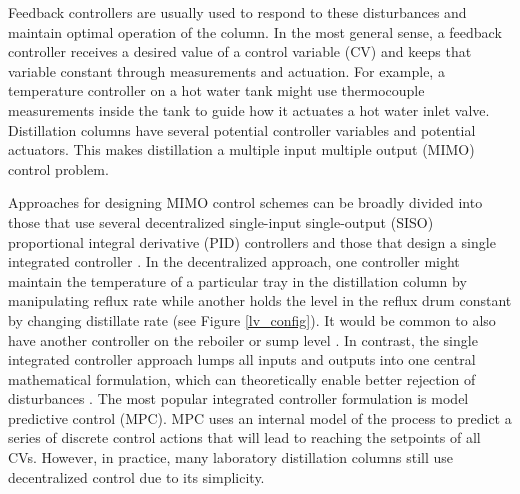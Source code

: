 Feedback controllers are usually used to respond to these disturbances and maintain optimal operation of the column.  In the most general sense, a feedback controller receives a desired value of a control variable (CV) and keeps that variable constant through measurements and actuation. For example, a temperature controller on a hot water tank might use thermocouple measurements inside the tank to guide how it actuates a hot water inlet valve. Distillation columns have several potential controller variables and potential actuators. This makes distillation a multiple input multiple output (MIMO) control problem. 

Approaches for designing MIMO control schemes can be broadly divided into those that use several decentralized single-input single-output (SISO) proportional integral derivative (PID) controllers\cite{Behroozsarand2012, Shen1994, Lin2006, Luyben1986} and those that design a single integrated controller \cite{Martin2013, Mesbah2017,Spielberg2019,Terzi2020}. In the decentralized approach, one controller might maintain the temperature of a particular tray in the distillation column by manipulating reflux rate while another holds the level in the reflux drum constant by changing distillate rate (see Figure \ref{lv_config}). It would be common to also have another controller on the reboiler or sump level \cite{Skogestad2007}. In contrast, the single integrated controller approach lumps all inputs and outputs into one central mathematical formulation, which can theoretically enable better rejection of disturbances \cite{Mesbah2017}. The most popular integrated controller formulation is model predictive control (MPC). MPC uses an internal model of the process to predict a series of discrete control actions that will lead to reaching the setpoints of all CVs.  However, in practice, many laboratory distillation columns still use decentralized control due to its simplicity.


